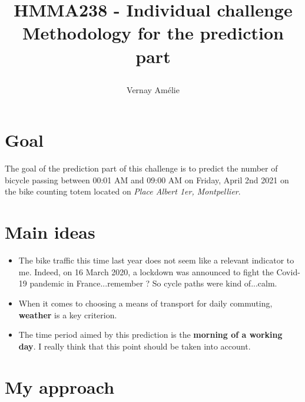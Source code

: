 \documentclass[11pt,a4paper]{article}
\author{Vernay Amélie}
\title{%
    \begin{minipage}\linewidth
        \centering
        HMMA238 - Individual challenge
        \vskip3pt
        \large Methodology for the prediction part
    \end{minipage}
}
\begin{document}
\maketitle

\section*{Goal}

The goal of the prediction part of this challenge is to predict the number of bicycle passing between 00:01 AM and 09:00 AM on Friday, April 2nd 2021 on the bike counting totem located on \textit{Place Albert 1er, Montpellier}.

\section*{Main ideas}

\begin{itemize}
\item The bike traffic this time last year does not seem like a relevant indicator to me. Indeed, on 16 March 2020, a lockdown was announced to fight the Covid-19 pandemic in France...remember ? So cycle paths were kind of...calm.
\item When it comes to choosing a means of transport for daily commuting, \textbf{weather} is a key criterion.
\item The time period aimed by this prediction is the \textbf{morning of a working day}. I really think that this point should be taken into account.
\end{itemize}

\section*{My approach}
\end{document}
